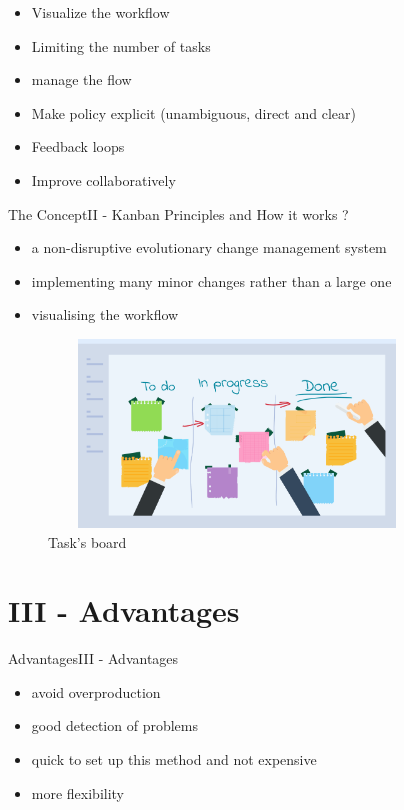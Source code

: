 \documentclass[10pt]{beamer}
\newcommand{\PII}{II - Kanban Principles and How it works ?}
\newcommand{\PIII}{III - Advantages}
\begin{document}
\begin{frame}
    \begin{itemize}
        \item Visualize the workflow
        \item Limiting the number of tasks 
        \item manage the flow
        \item Make policy explicit (unambiguous, direct and clear)
        \item Feedback loops
        \item Improve collaboratively 

    \end{itemize}  
\end{frame}

\begin{frame}{The Concept}{\PII}
    \begin{itemize}
        \item a non-disruptive evolutionary change management system
        \item implementing many minor changes rather than a large one
        \item visualising the workflow
    \end{itemize}
     \begin{figure}
      \centering
   \includegraphics[width=10cm, height=5cm]{ph.png}
      \caption{Task's board}
     \end{figure}
\end{frame}

\section{\PIII} 
\begin{frame}{Advantages}{\PIII}
    \begin{itemize}
        \item avoid overproduction
        \item good detection of problems
        \item quick to set up this method and not expensive
        \item more flexibility 
    \end{itemize}

\end{frame}
\end{document}
